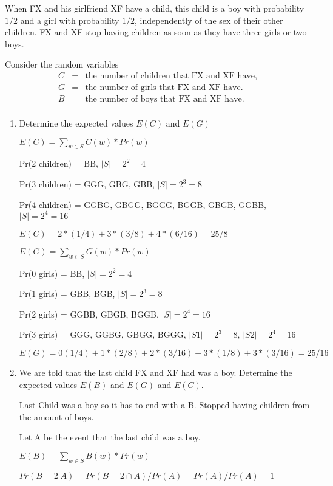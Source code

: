 \documentclass[12pt]{article}
\newcounter{ques}
\newenvironment{question}{\stepcounter{ques}{\noindent\bf Question \arabic{ques}:}}{\vspace{5mm}}
\begin{document}
\begin{question}
	When FX and his girlfriend XF have a child, this child is a boy with 
	probability $1/2$ and a girl with probability $1/2$, independently of 
	the sex of their other children. FX and XF stop having children as soon 
	as they have three girls or two boys. 
	
	
	Consider the random variables 
	\begin{eqnarray*} 
		C & = & \mbox{the number of children that FX and XF have,} \\ 
		G & = & \mbox{the number of girls that FX and XF have.} \\ 
		B & = & \mbox{the number of boys that FX and XF have.} \\ 
	\end{eqnarray*} 

\begin{enumerate}
	\item Determine the expected values $E(C)$ and $E(G)$
	
	$E(C) = \sum_{w \in S} C(w) * Pr(w)$

	Pr(2 children) = {BB}, $|S| = 2^2 = 4$

	Pr(3 children) = {GGG, GBG, GBB}, $|S| = 2^3 = 8$

	Pr(4 children) = {GGBG, GBGG, BGGG, BGGB, GBGB, GGBB}, $|S| = 2^4 = 16$

	$E(C) = 2 * (1/4) + 3 * (3/8) + 4 * (6/16) = 25/8$

	$E(G) = \sum_{w \in S} G(w) * Pr(w)$

	Pr(0 girls) = {BB}, $|S| = 2^2 = 4$

	Pr(1 girls) = {GBB, BGB}, $|S| = 2^3 = 8$

	Pr(2 girls) = {GGBB, GBGB, BGGB}, $|S| = 2^4 = 16$

	Pr(3 girls) = {GGG, GGBG, GBGG, BGGG}, $|S1| = 2^3 = 8$, $|S2| = 2^4 = 16$

	$E(G) = 0 (1/4) + 1 * (2/8) + 2 * (3/16) + 3 * (1/8) + 3 * (3/16) = 25/16$

	\item We are told that the last child FX and XF had was a boy. Determine the expected values $E(B)$ and $E(G)$ and $E(C)$.

	Last Child was a boy so it has to end with a B. Stopped having children from the amount of boys.

	Let A be the event that the last child was a boy.

	$E(B)  = \sum_{w \in S} B(w) * Pr(w)$

	$Pr(B = 2| A) = Pr(B = 2 \cap A) / Pr(A) = Pr(A) / Pr(A) = 1$


\end{enumerate}
\end{question}
\end{document}
